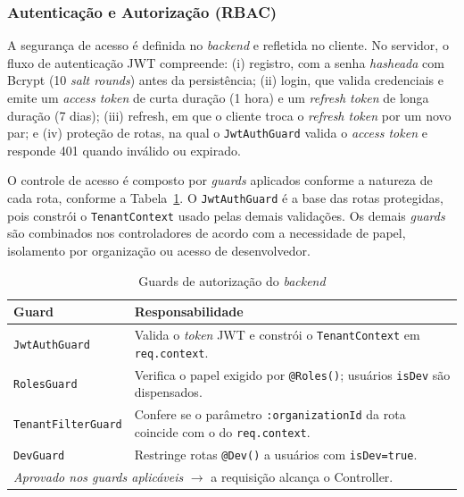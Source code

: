 \subsubsection{Autenticação e Autorização (RBAC)}
\label{sec:autenticacao}

A segurança de acesso é definida no \textit{backend} e refletida no cliente. No servidor, o fluxo de autenticação JWT compreende: (i) registro, com a senha \textit{hasheada} com Bcrypt (10 \textit{salt rounds}) antes da persistência; (ii) login, que valida credenciais e emite um \textit{access token} de curta duração (1 hora) e um \textit{refresh token} de longa duração (7 dias); (iii) refresh, em que o cliente troca o \textit{refresh token} por um novo par; e (iv) proteção de rotas, na qual o \texttt{JwtAuthGuard} valida o \textit{access token} e responde 401 quando inválido ou expirado.

O controle de acesso é composto por \textit{guards} aplicados conforme a natureza de cada rota, conforme a Tabela~\ref{tab:auth_pipeline}. O \texttt{JwtAuthGuard} é a base das rotas protegidas, pois constrói o \texttt{TenantContext} usado pelas demais validações. Os demais \textit{guards} são combinados nos controladores de acordo com a necessidade de papel, isolamento por organização ou acesso de desenvolvedor.

\begin{table}[H]
\centering
\caption{Guards de autorização do \textit{backend}}
\label{tab:auth_pipeline}
\begin{tabularx}{\textwidth}{l X}
\toprule
\textbf{Guard} & \textbf{Responsabilidade} \\
\midrule
\texttt{JwtAuthGuard}      & Valida o \textit{token} JWT e constrói o \texttt{TenantContext} em \texttt{req.context}. \\
\texttt{RolesGuard}        & Verifica o papel exigido por \texttt{@Roles()}; usuários \texttt{isDev} são dispensados. \\
\texttt{TenantFilterGuard} & Confere se o parâmetro \texttt{:organizationId} da rota coincide com o do \texttt{req.context}. \\
\texttt{DevGuard}          & Restringe rotas \texttt{@Dev()} a usuários com \texttt{isDev=true}. \\
\midrule
\multicolumn{2}{l}{\textit{Aprovado nos guards aplicáveis} $\rightarrow$ a requisição alcança o Controller.} \\
\bottomrule
\end{tabularx}
\end{table}

